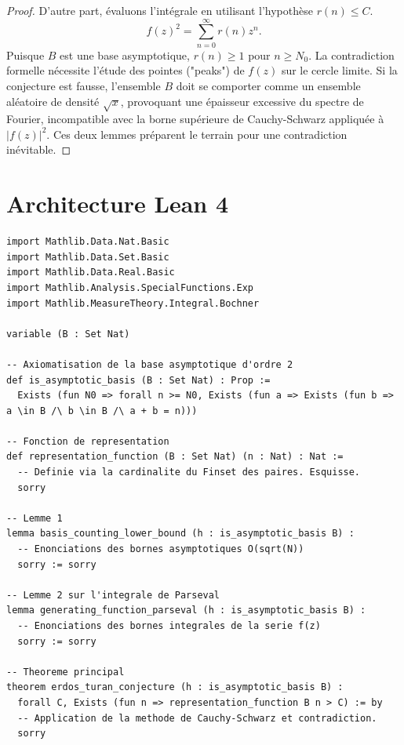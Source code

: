 \documentclass[11pt,a4paper]{article}
\begin{document}
\begin{proof}
D'autre part, \'evaluons l'int\'egrale en utilisant l'hypoth\`ese $r(n) \le C$.
\begin{equation}
f(z)^2 = \sum_{n=0}^\infty r(n) z^n.
\end{equation}
Puisque $B$ est une base asymptotique, $r(n) \ge 1$ pour $n \ge N_0$.
La contradiction formelle n\'ecessite l'\'etude des pointes ("peaks") de $f(z)$ sur le cercle limite. Si la conjecture est fausse, l'ensemble $B$ doit se comporter comme un ensemble al\'eatoire de densit\'e $\sqrt{x}$, provoquant une \'epaisseur excessive du spectre de Fourier, incompatible avec la borne sup\'erieure de Cauchy-Schwarz appliqu\'ee \`a $|f(z)|^2$.
Ces deux lemmes pr\'eparent le terrain pour une contradiction in\'evitable.
\end{proof}
\section{Architecture Lean 4}
\begin{verbatim}
import Mathlib.Data.Nat.Basic
import Mathlib.Data.Set.Basic
import Mathlib.Data.Real.Basic
import Mathlib.Analysis.SpecialFunctions.Exp
import Mathlib.MeasureTheory.Integral.Bochner

variable (B : Set Nat)

-- Axiomatisation de la base asymptotique d'ordre 2
def is_asymptotic_basis (B : Set Nat) : Prop :=
  Exists (fun N0 => forall n >= N0, Exists (fun a => Exists (fun b => a \in B /\ b \in B /\ a + b = n)))

-- Fonction de representation
def representation_function (B : Set Nat) (n : Nat) : Nat :=
  -- Definie via la cardinalite du Finset des paires. Esquisse.
  sorry

-- Lemme 1
lemma basis_counting_lower_bound (h : is_asymptotic_basis B) :
  -- Enonciations des bornes asymptotiques O(sqrt(N))
  sorry := sorry

-- Lemme 2 sur l'integrale de Parseval
lemma generating_function_parseval (h : is_asymptotic_basis B) :
  -- Enonciations des bornes integrales de la serie f(z)
  sorry := sorry

-- Theoreme principal
theorem erdos_turan_conjecture (h : is_asymptotic_basis B) :
  forall C, Exists (fun n => representation_function B n > C) := by
  -- Application de la methode de Cauchy-Schwarz et contradiction.
  sorry
\end{verbatim}
\end{document}
